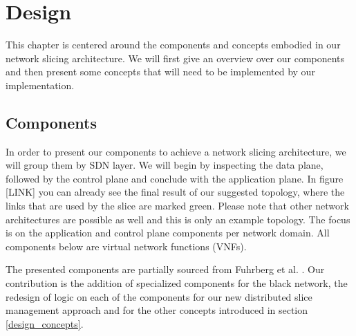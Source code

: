 \chapter{Design}
\label{design}
\iffalse
\begin{itemize}
    \item Components
    \begin{itemize}
        \item Overview
        \item ESMF \& CTMF
        \item DSMF \& DTMF
        \item Controller
        \item SDN Switch
        \item VPN Gateway
    \end{itemize}
    \item Concepts
    \begin{itemize}
        \item Distributed trust and authority
        \item State synchronization (2PCP)
        \item Strict separation of SDN layers
    \end{itemize}
\end{itemize}
\fi
This chapter is centered around the components and concepts embodied in our network slicing architecture. We will first give an overview over our components and then present some concepts that will need to be implemented by our implementation.

\section{Components}
In order to present our components to achieve a network slicing architecture, we will group them by SDN layer. We will begin by inspecting the data plane, followed by the control plane and conclude with the application plane. In figure [LINK] you can already see the final result of our suggested topology, where the links that are used by the slice are marked green. Please note that other network architectures are possible as well and this is only an example topology. The focus is on the application and control plane components per network domain. All components below are virtual network functions (VNFs).

The presented components are partially sourced from Fuhrberg et al. \cite{SE4}. Our contribution is the addition of specialized components for the black network, the redesign of logic on each of the components for our new distributed slice management approach and for the other concepts introduced in section \ref{design_concepts}.

